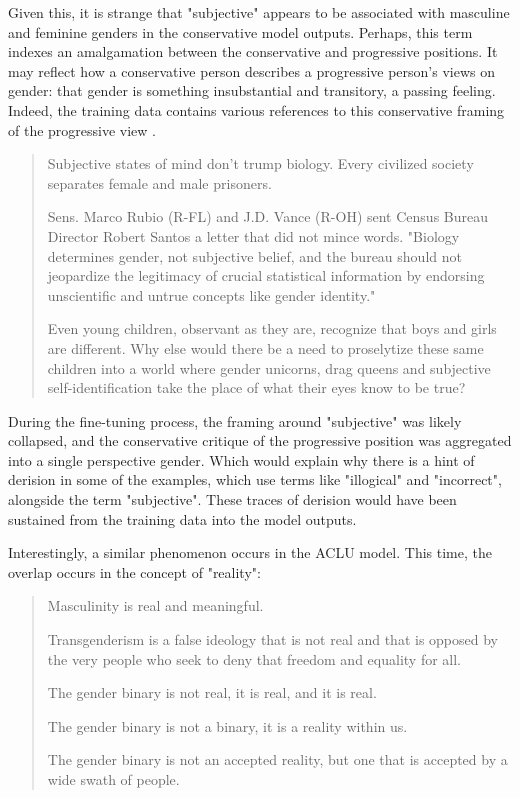\documentclass[letterpaper]{article} %
\begin{document}
Given this, it is strange that "subjective" appears to be associated with masculine and feminine genders in the conservative model outputs. Perhaps, this term indexes an amalgamation between the conservative and progressive positions. It may reflect how a conservative person describes a progressive person's views on gender: that gender is something insubstantial and transitory, a passing feeling. Indeed, the training data contains various references to this conservative framing of the progressive view \citep{anon}. 

\begin{quote}
Subjective states of mind don't trump biology. Every civilized society separates female and male prisoners.

Sens. Marco Rubio (R-FL) and J.D. Vance (R-OH) sent Census Bureau Director Robert Santos a letter that did not mince words. "Biology determines gender, not subjective belief, and the bureau should not jeopardize the legitimacy of crucial statistical information by endorsing unscientific and untrue concepts like gender identity."

Even young children, observant as they are, recognize that boys and girls are different. Why else would there be a need to proselytize these same children into a world where gender unicorns, drag queens and subjective self-identification take the place of what their eyes know to be true?
\end{quote}

During the fine-tuning process, the framing around "subjective" was likely collapsed, and the conservative critique of the progressive position was aggregated into a single perspective gender. Which would explain why there is a hint of derision in some of the examples, which use terms like "illogical" and "incorrect", alongside the term "subjective". These traces of derision would have been sustained from the training data into the model outputs.

Interestingly, a similar phenomenon occurs in the ACLU model. This time, the overlap occurs in the concept of "reality":

\begin{quote}

Masculinity is real and meaningful.

Transgenderism is a false ideology that is not real and that is
opposed by the very people who seek to deny that freedom and equality
for all.

The gender binary is not real, it is real, and it is real.

The gender binary is not a binary, it is a reality within us.

The gender binary is not an accepted reality, but one that is accepted
by a wide swath of people.

\end{quote}
\end{document}

